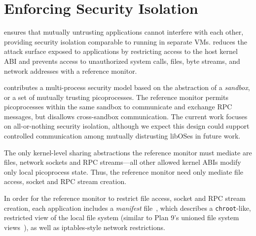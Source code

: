 \section{Enforcing Security Isolation}
\label{sec:graphene:security}

\sysname{} ensures that mutually untrusting applications 
cannot interfere with each other, providing security isolation
comparable to running in separate VMs.
\sysname{} reduces the attack surface exposed to applications
by restricting access to the host kernel ABI 
and prevents access to unauthorized system calls, files, byte streams,
and network addresses with a reference monitor.

\sysname{} contributes a multi-process security model 
based on the abstraction of a {\em sandbox},
or a set of mutually trusting picoprocesses.
The reference monitor permits picoprocesses within the same sandbox
to communicate and exchange RPC messages, but disallows cross-sandbox communication.
The current work focuses on all-or-nothing security isolation, although we expect
this design could support
controlled communication among mutually distrusting libOSes
in future work.


The only kernel-level sharing abstractions the reference monitor must mediate
are files, network sockets and RPC streams---all other allowed kernel ABIs
modify only local picoprocess state.
Thus, the reference monitor need only mediate file access, socket and RPC stream creation.


In order for the reference monitor to restrict file access, socket and RPC stream creation,
each application includes a {\em manifest} file~\citep{hunt07rethink},
which describes a {\tt chroot}-like, restricted view of the local 
file system (similar to Plan 9's unioned file system views~\citep{pike90plan9}),
as well as iptables-style network restrictions.



